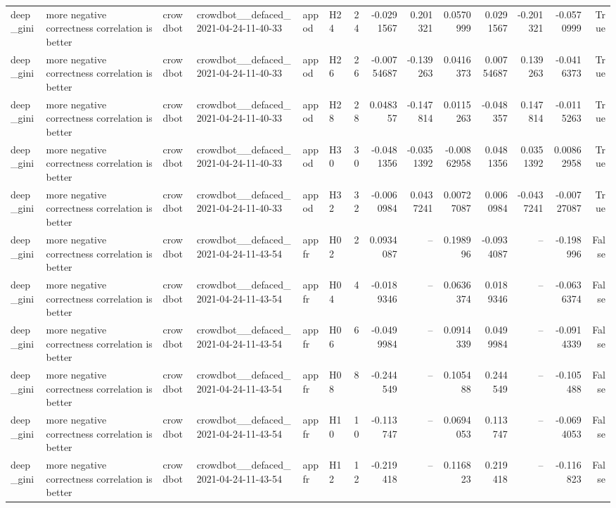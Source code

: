 \begin{longtable}{llllllrrrrrrrr}
deep\_gini & more negative correctness correlation is better & crowdbot & crowdbot\_\_defaced\_2021-04-24-11-40-33 & appod & H24 & 24 & -0.0291567 & 0.201321 & 0.0570999 & 0.0291567 & -0.201321 & -0.0570999 & True \\
deep\_gini & more negative correctness correlation is better & crowdbot & crowdbot\_\_defaced\_2021-04-24-11-40-33 & appod & H26 & 26 & -0.00754687 & -0.139263 & 0.0416373 & 0.00754687 & 0.139263 & -0.0416373 & True \\
deep\_gini & more negative correctness correlation is better & crowdbot & crowdbot\_\_defaced\_2021-04-24-11-40-33 & appod & H28 & 28 & 0.048357 & -0.147814 & 0.0115263 & -0.048357 & 0.147814 & -0.0115263 & True \\
deep\_gini & more negative correctness correlation is better & crowdbot & crowdbot\_\_defaced\_2021-04-24-11-40-33 & appod & H30 & 30 & -0.0481356 & -0.0351392 & -0.00862958 & 0.0481356 & 0.0351392 & 0.00862958 & True \\
deep\_gini & more negative correctness correlation is better & crowdbot & crowdbot\_\_defaced\_2021-04-24-11-40-33 & appod & H32 & 32 & -0.0060984 & 0.0437241 & 0.00727087 & 0.0060984 & -0.0437241 & -0.00727087 & True \\
deep\_gini & more negative correctness correlation is better & crowdbot & crowdbot\_\_defaced\_2021-04-24-11-43-54 & appfr & H02 & 2 & 0.0934087 & -- & 0.198996 & -0.0934087 & -- & -0.198996 & False \\
deep\_gini & more negative correctness correlation is better & crowdbot & crowdbot\_\_defaced\_2021-04-24-11-43-54 & appfr & H04 & 4 & -0.0189346 & -- & 0.0636374 & 0.0189346 & -- & -0.0636374 & False \\
deep\_gini & more negative correctness correlation is better & crowdbot & crowdbot\_\_defaced\_2021-04-24-11-43-54 & appfr & H06 & 6 & -0.0499984 & -- & 0.0914339 & 0.0499984 & -- & -0.0914339 & False \\
deep\_gini & more negative correctness correlation is better & crowdbot & crowdbot\_\_defaced\_2021-04-24-11-43-54 & appfr & H08 & 8 & -0.244549 & -- & 0.105488 & 0.244549 & -- & -0.105488 & False \\
deep\_gini & more negative correctness correlation is better & crowdbot & crowdbot\_\_defaced\_2021-04-24-11-43-54 & appfr & H10 & 10 & -0.113747 & -- & 0.0694053 & 0.113747 & -- & -0.0694053 & False \\
deep\_gini & more negative correctness correlation is better & crowdbot & crowdbot\_\_defaced\_2021-04-24-11-43-54 & appfr & H12 & 12 & -0.219418 & -- & 0.116823 & 0.219418 & -- & -0.116823 & False \\

\end{longtable}
